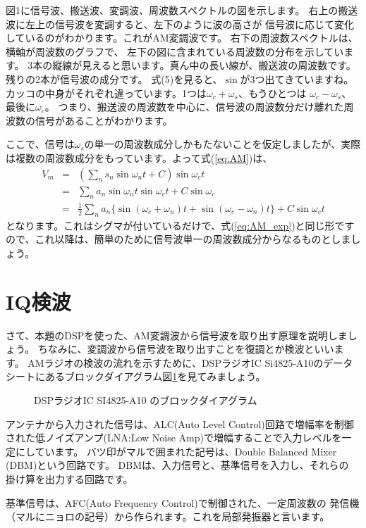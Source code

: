 図1に信号波、搬送波、変調波、周波数スペクトルの図を示します。
右上の搬送波に左上の信号波を変調すると、左下のように波の高さが
信号波に応じて変化しているのがわかります。これがAM変調波です。
右下の周波数スペクトルは、横軸が周波数のグラフで、
左下の図に含まれている周波数の分布を示しています。
3本の縦線が見えると思います。真ん中の長い線が、搬送波の周波数です。
残りの2本が信号波の成分です。
式(5)を見ると、$\sin$が3つ出てきていますね。
カッコの中身がそれぞれ違っています。1つは$\omega_c + \omega_s$、もうひとつは
$\omega_c - \omega_s$、最後に$\omega_c$。
つまり、搬送波の周波数を中心に、信号波の周波数分だけ離れた周波数の信号があることがわかります。

ここで、信号は$\omega_s$の単一の周波数成分しかもたないことを仮定しましたが、実際は複数の周波数成分をもっています。よって式(\ref{eq:AM})は、
\begin{eqnarray}
V_m &=&  (\sum_n s_n\sin\omega_n t + C)\sin\omega_c t \nonumber \\
&=& \sum_n a_n\sin\omega_n t \sin\omega_c t + C\sin\omega_c \nonumber \\
&=& \frac{1}{2}\sum_n{a_n\{\sin(\omega_c + \omega_n)t + \sin(\omega_c - \omega_n)t}\} + C\sin\omega_ct \nonumber
\end{eqnarray}
となります。これはシグマが付いているだけで、式(\ref{eq:AM_exp})と同じ形ですので、これ以降は、簡単のために信号波単一の周波数成分からなるものとしましょう。

\section*{IQ検波}
さて、本題のDSPを使った、AM変調波から信号波を取り出す原理を説明しましょう。
ちなみに、変調波から信号波を取り出すことを復調とか検波といいます。
AMラジオの検波の流れを示すために、DSPラジオIC Si4825-A10のデータシートにあるブロックダイアグラム図\ref{fig:block}を見てみましょう。


\begin{figure}
\caption{DSPラジオIC SI4825-A10 のブロックダイアグラム}
\label{fig:block}
\end{figure}

アンテナから入力された信号は、ALC(Auto Level Control)回路で増幅率を制御された低ノイズアンプ(LNA:Low Noise Amp)で増幅することで入力レベルを一定にしています。
バツ印がマルで囲まれた記号は、Double Balanced Mixer (DBM)という回路です。
DBMは、入力信号と、基準信号を入力し、それらの
掛け算を出力する回路です。

基準信号は、AFC(Auto Frequency Control)で制御された、一定周波数の
発信機（マルにニョロの記号）から作られます。これを局部発振器と言います。

